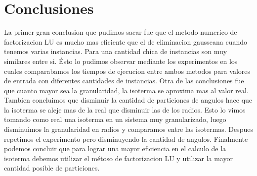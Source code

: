 \section{Conclusiones}

{La primer gran conclusion que pudimos sacar fue que el metodo numerico de factorizacion LU es mucho mas eficiente que el de eliminacion gausseana cuando tenemos varias instancias. Para una cantidad chica de instancias son muy similares entre si. Ésto lo pudimos observar mediante los experimentos en los cuales comparabamos los tiempos de ejecucion entre ambos metodos para valores de entrada con diferentes cantidades de instancias. 
Otra de las conclusiones fue que cuanto mayor sea la granularidad, la isoterma se aproxima mas al valor real. Tambien concluimos que disminuir la cantidad de particiones de angulos hace que la isoterma se aleje mas de la real que disminuir las de los radios. Esto lo vimos tomando como real una isoterma en un sistema muy granularizado, luego disminuimos la granularidad en radios y comparamos entre las isotermas. Despues repetimos el experimento pero disminuyendo la cantidad de angulos.
Finalmente podemos concluir que para lograr una mayor eficiencia en el calculo de la isoterma debemos utilizar el métoso de factorizacion LU y utilizar la mayor cantidad posible de particiones.}